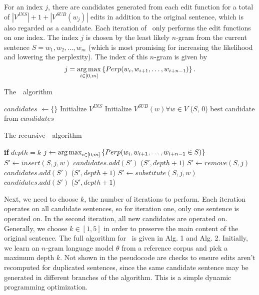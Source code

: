 For an index $j$, there are candidates generated from each edit function for a
total of $|V^{INS}| + 1 + |V^{SUB}(w_j)|$ edits in addition to the original
sentence, which is also regarded as a candidate. Each iteration of \sd~only
performs the edit functions on one index. The index $j$ is chosen by the least
likely $n$-gram from the current sentence $S=w_1,w_2,\ldots,w_m$ (which is most
promising for increasing the likelihood and lowering the perplexity). The index
of this $n$-gram is given by
$$j = \operatorname*{arg\,max}_{i\in [0,m]} \left\{Perp(w_i,w_{i+1},\ldots,w_{i+n-1})\right\}.$$

\begin{algorithm}[t]
\caption{The~\sd~algorithm}
\begin{algorithmic}
    \State $candidates$ $\leftarrow \{\}$
    \State Initialize $V^{INS}$
    \State Initialize $V^{SUB}(w)\forall w\in V$
    \State\sd($S$, 0)
    \State \Return best candidate from $candidates$
    \EndProcedure
\end{algorithmic}
\end{algorithm}


\begin{algorithm}[t]
\caption{The recursive~\sd~algorithm}
\begin{algorithmic}
    \State \Return \textbf{if} $depth = k$
    \State $j \leftarrow \operatorname*{arg\,max}_{i\in [0,m]}
        \left\{Perp(w_i,w_{i+1},\ldots,w_{i+n-1}\in S)\right\}$
    \State $S' \leftarrow insert(S, j, w)$
    \State $candidates.add(S')$
    \State\sd($S', depth+1$)
    \EndFor
    \State $S' \leftarrow remove(S, j)$
    \State $candidates.add(S')$
    \State\sd($S', depth+1$)
    \State $S' \leftarrow substitute(S, j, w)$
    \State $candidates.add(S')$
    \State\sd($S', depth+1$)
    \EndFor
    \EndProcedure
\end{algorithmic}
\end{algorithm}


Next, we need to choose $k$, the number of iterations to perform. Each iteration
operates on all candidate sentences, so for iteration one, only one sentence is
operated on. In the second iteration, all new candidates are operated on.
Generally, we choose $k\in[1,5]$ in order to preserve the main content of the
original sentence. The full algorithm for \sd~is given in Alg. 1 and Alg. 2.
Initially, we learn an $n$-gram language model $\theta$ from a reference corpus
and pick a maximum depth $k$. Not shown in the pseudocode are checks to ensure
edits aren't recomputed for duplicated sentences, since the same candidate
sentence may be generated in different branches of the algorithm. This is a
simple dynamic programming optimization.

